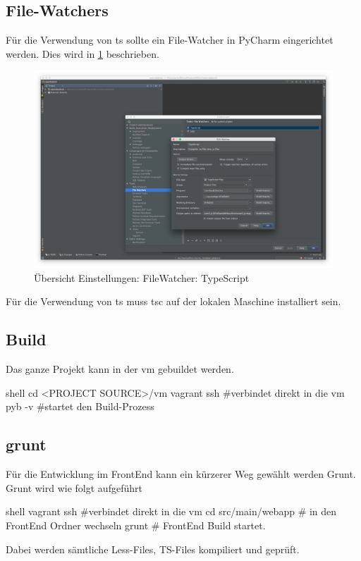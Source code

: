 \subsection{File-Watchers}
Für die Verwendung von \ac{ts} sollte ein File-Watcher in \acs{PyCharm} eingerichtet werden. Dies wird in \cref{fig:sd:watcher-typescript} beschrieben.
\begin{figure}[H]
	\centering
	\includegraphics[width=\linewidth]{fig/watcher_typescript}
	\caption{Übersicht Einstellungen: FileWatcher: TypeScript}
	\label{fig:sd:watcher-typescript}
\end{figure}
Für die Verwendung von \ac{ts} muss tsc auf der lokalen Maschine installiert sein.

\subsection{Build}
Das ganze Projekt kann in der \ac{vm} gebuildet werden. 
\begin{src}{shell}
cd <PROJECT SOURCE>/vm
vagrant ssh #verbindet direkt in die vm
pyb -v #startet den Build-Prozess
\end{src}
\subsection{grunt}
Für die Entwicklung im FrontEnd kann ein kürzerer Weg gewählt werden \textendash Grunt.
Grunt wird wie folgt aufgeführt
\begin{src}{shell}
vagrant ssh #verbindet direkt in die vm
cd src/main/webapp # in den FrontEnd Ordner wechseln
grunt # FrontEnd Build startet.
\end{src}
Dabei werden sämtliche Less-Files, TS-Files kompiliert und geprüft.
